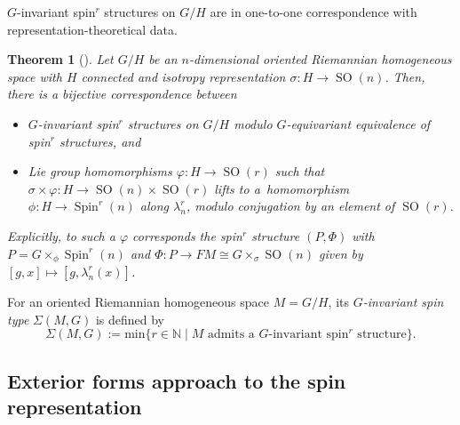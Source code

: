 \documentclass[pdftex]{sigma}
\numberwithin{equation}{section}
\newtheorem{Theorem}{Theorem}[section]
\DeclareMathOperator{\SO}{SO}
\DeclareMathOperator{\Spin}{Spin}
\begin{document}
		$G$-invariant spin$^r$ structures on $G/H$ are in one-to-one correspondence with representation-theoretical data.
		\begin{Theorem}[\cite{gen_spin_AL}]\label{cor:inv_gen_spin}
			Let $G/H$ be an $n$-dimensional oriented Riemannian homogeneous space with $H$ connected and isotropy representation $\sigma \colon H \to \SO(n)$. Then, there is a bijective correspondence between
			\begin{itemize}\itemsep=0pt
				\item $G$-invariant spin$^r$ structures on $G/H$ modulo $G$-equivariant equivalence of spin$^r$ structures, and
				\item Lie group homomorphisms $\varphi \colon H \to \SO(r)$ such that $\sigma \times \varphi \colon H \to \SO(n) \times \SO(r)$ lifts to a~homomorphism $\phi \colon H \to \Spin^r(n)$ along $\lambda_n^r$, modulo conjugation by an element of $\SO(r)$.
			\end{itemize}
			Explicitly, to such a $\varphi$ corresponds the spin$^r$ structure $(P,\Phi)$ with $P = G \times_{\phi} \Spin^r(n)$ and $ \Phi \colon P \to FM \cong G \times_{\sigma} \SO(n)$ given by $[g,x] \mapsto [g,\lambda_{n}^{r}(x)]$.
		\end{Theorem}
		\begin{Definition} \label{deff:types}
			For an oriented Riemannian homogeneous space $M=G/H$, its \textit{$G$-invariant spin type} $\Sigma(M,G)$ is defined by
			\[
			\Sigma(M,G):= \text{min}\{ r\in \mathbb{N} \mid M \text{ admits a $G$-invariant spin$^r$ structure}\} .
			\]
		\end{Definition}
		
		\subsection{Exterior forms approach to the spin representation} \label{sec:diff_forms_approach}
		
\end{document}
